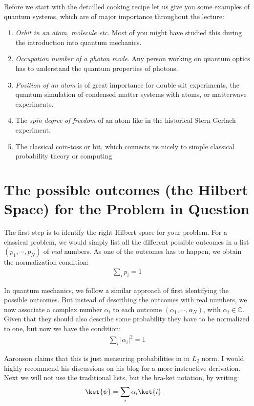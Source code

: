 Before we start with the detailled cooking recipe let us give you some examples of  quantum systems, which are of major importance throughout the lecture:
\begin{enumerate}
\item \textit{Orbit in an atom, molecule etc}. Most of you might have studied this during the introduction into quantum mechanics.
\item \textit{Occupation number of a photon mode}. Any person working on quantum optics has to understand the quantum properties of photons.
\item \textit{Position of an atom} is of great importance for double slit experiments, the quantum simulation of condensed matter systems with atoms,  or matterwave experiments.
\item The \textit{spin degree of freedom} of an atom like in the historical Stern-Gerlach experiment. 
\item The classical coin-toss or bit, which connects us nicely to simple classical probability theory or computing
\end{enumerate}

\section{The possible outcomes  (the Hilbert Space) for the Problem in Question}

The first step is to identify the right Hilbert space for your problem. For a classical problem, we would simply list all the different possible outcomes in a list $(p_1, \cdots, p_N)$ of \textit{real} numbers. As one of the outcomes has to happen, we obtain the normalization condition:
\begin{align}
\sum_i p_i = 1
\end{align}

In quantum mechanics, we follow a similar approach of first identifying the possible outcomes. But instead of describing the outcomes with real numbers, we now associate a complex number $\alpha_i$ to each outcome $(\alpha_1, \cdots, \alpha_N)$, with $\alpha_i \in \mathbb{C}$. Given that they should also describe some probability they have to be normalized to one, but now we have the condition:
\begin{align}
\sum_i |\alpha_i|^2 = 1
\end{align}

Aaronson claims that this is just measuring probabilities in in $L_2$ norm. I would highly recommend his discussions on his blog for a more instructive derivation\cite{quantum}. Next we will not use the traditional lists, but the bra-ket notation, by writing:
\begin{align}
\ket{\psi}&= \sum_i \alpha_i \ket{i}
\end{align}

